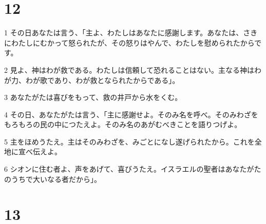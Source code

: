 \chapter{12}

\par 1 その日あなたは言う、「主よ、わたしはあなたに感謝します。あなたは、さきにわたしにむかって怒られたが、その怒りはやんで、わたしを慰められたからです。
\par 2 見よ、神はわが救である。わたしは信頼して恐れることはない。主なる神はわが力、わが歌であり、わが救となられたからである」。
\par 3 あなたがたは喜びをもって、救の井戸から水をくむ。
\par 4 その日、あなたがたは言う、「主に感謝せよ。そのみ名を呼べ。そのみわざをもろもろの民の中につたえよ。そのみ名のあがむべきことを語りつげよ。
\par 5 主をほめうたえ。主はそのみわざを、みごとになし遂げられたから。これを全地に宣べ伝えよ。
\par 6 シオンに住む者よ、声をあげて、喜びうたえ。イスラエルの聖者はあなたがたのうちで大いなる者だから」。

\chapter{13}

